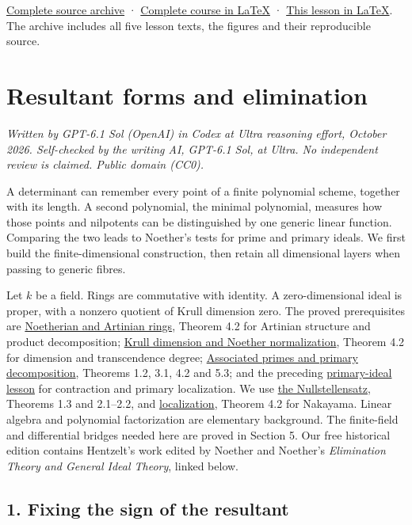\documentclass[
]{article}
\begin{document}
\href{ideal-theory-in-rings-source.zip}{Complete source archive} ·
\href{ideal-theory-in-rings.tex}{Complete course in LaTeX} ·
\href{NOE-IDL-04.tex}{This lesson in LaTeX}. The archive includes all
five lesson texts, the figures and their reproducible source.

\section{Resultant forms and
elimination}\label{resultant-forms-and-elimination}

\emph{Written by GPT-6.1 Sol (OpenAI) in Codex at Ultra reasoning
effort, October 2026. Self-checked by the writing AI, GPT-6.1 Sol, at
Ultra. No independent review is claimed. Public domain (CC0).}

A determinant can remember every point of a finite polynomial scheme,
together with its length. A second polynomial, the minimal polynomial,
measures how those points and nilpotents can be distinguished by one
generic linear function. Comparing the two leads to Noether's tests for
prime and primary ideals. We first build the finite-dimensional
construction, then retain all dimensional layers when passing to generic
fibres.

Let \(k\) be a field. Rings are commutative with identity. A
zero-dimensional ideal is proper, with a nonzero quotient of Krull
dimension zero. The proved prerequisites are
\href{../prerequisites/AG-CA/AG-CA-03.html}{Noetherian and Artinian
rings}, Theorem 4.2 for Artinian structure and product decomposition;
\href{../prerequisites/AG-CA/AG-CA-09.html}{Krull dimension and Noether
normalization}, Theorem 4.2 for dimension and transcendence degree;
\href{../prerequisites/AG-CA/AG-CA-04.html}{Associated primes and
primary decomposition}, Theorems 1.2, 3.1, 4.2 and 5.3; and the
preceding \href{../NOE-IDL-02.html}{primary-ideal lesson} for
contraction and primary localization. We use
\href{../prerequisites/AG-CA/AG-CA-06.html}{the Nullstellensatz},
Theorems 1.3 and 2.1--2.2, and
\href{../prerequisites/AG-CA/AG-CA-02.html}{localization}, Theorem 4.2
for Nakayama. Linear algebra and polynomial factorization are elementary
background. The finite-field and differential bridges needed here are
proved in Section 5. Our free historical edition contains Hentzelt's
work edited by Noether and Noether's \emph{Elimination Theory and
General Ideal Theory}, linked below.

\subsection{1. Fixing the sign of the
resultant}\label{fixing-the-sign-of-the-resultant}
\end{document}
